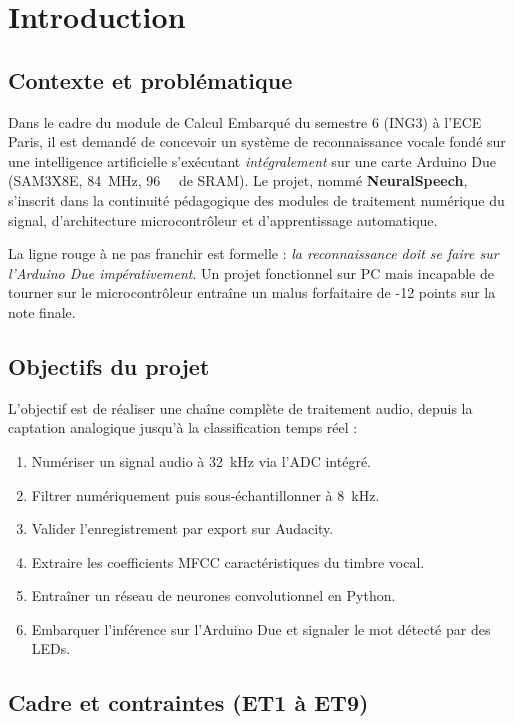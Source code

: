 \section{Introduction}

\subsection{Contexte et problématique}

Dans le cadre du module de Calcul Embarqué du semestre 6 (ING3) à l'ECE Paris, il est demandé de concevoir un système de reconnaissance vocale fondé sur une intelligence artificielle s'exécutant \emph{intégralement} sur une carte Arduino Due (SAM3X8E, \SI{84}{\mega\hertz}, \SI{96}{\kibi\byte} de SRAM). Le projet, nommé \textbf{NeuralSpeech}, s'inscrit dans la continuité pédagogique des modules de traitement numérique du signal, d'architecture microcontrôleur et d'apprentissage automatique.

La ligne rouge à ne pas franchir est formelle : \emph{la reconnaissance doit se faire sur l'Arduino Due impérativement}. Un projet fonctionnel sur PC mais incapable de tourner sur le microcontrôleur entraîne un malus forfaitaire de -12 points sur la note finale.

\subsection{Objectifs du projet}

L'objectif est de réaliser une chaîne complète de traitement audio, depuis la captation analogique jusqu'à la classification temps réel :
\begin{enumerate}
    \item Numériser un signal audio à \SI{32}{\kilo\hertz} via l'ADC intégré.
    \item Filtrer numériquement puis sous-échantillonner à \SI{8}{\kilo\hertz}.
    \item Valider l'enregistrement par export sur Audacity.
    \item Extraire les coefficients MFCC caractéristiques du timbre vocal.
    \item Entraîner un réseau de neurones convolutionnel en Python.
    \item Embarquer l'inférence sur l'Arduino Due et signaler le mot détecté par des LEDs.
\end{enumerate}

\subsection{Cadre et contraintes (ET1 à ET9)}

